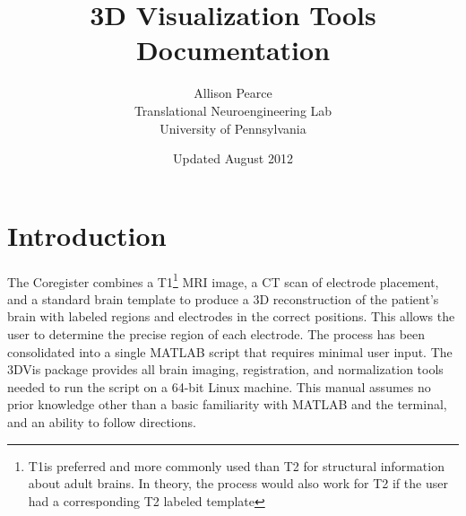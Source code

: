 \documentclass[12pt]{article}
\title{3D Visualization Tools Documentation}
\author{Allison Pearce\\Translational Neuroengineering Lab\\University of Pennsylvania}
\date{Updated August 2012}
\begin{document}
\maketitle



\renewcommand{\cftsecleader}{\cftdotfill{\cftdotsep}}
\tableofcontents


\newpage
{}
\section{Introduction}
The Coregister combines a T1\footnote{T1is preferred and more commonly used than T2 for structural information about adult brains. In theory, the process would also work for T2 if the user had a corresponding T2 labeled template} MRI image, a CT scan of electrode placement, and a standard brain template to produce a 3D reconstruction of the patient's brain with labeled regions and electrodes in the correct positions. This allows the user to determine the precise region of each electrode. The process has been consolidated into a single MATLAB script that requires minimal user input. The 3DVis package provides all brain imaging, registration, and normalization tools needed to run the script on a 64-bit Linux machine. This manual assumes no prior knowledge other than a basic familiarity with MATLAB and the terminal, and an ability to follow directions.
\end{document}

